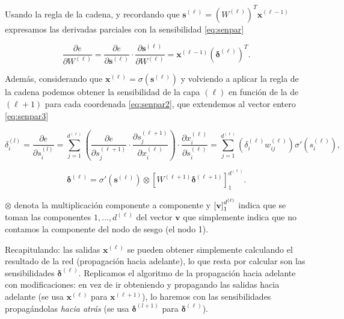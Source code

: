 Usando la regla de la cadena, y recordando que $\textbf{s}^{(\ell)} = (W^{(\ell)})^T \textbf{x}^{(\ell-1)}$ expresamos las derivadas parciales con la sensibilidad \eqref{eq:senpar} \cite{abu2012learning}

\begin{equation}
  \dfrac{\partial e}{\partial W^{(\ell)}} = \dfrac{\partial e}{\partial \textbf{s}^{(\ell)}} \cdot \dfrac{\partial \textbf{s}^{(\ell)}}{\partial W^{(\ell)}} = \textbf{x}^{(\ell - 1)}(\pmb{\delta}^{(\ell)})^T.
  \label{eq:senpar}
\end{equation}

Además, considerando que $\textbf{x}^{(\ell)} = \sigma(\textbf{s}^{(\ell)})$ y volviendo a aplicar la regla de la cadena podemos obtener la sensibilidad de la capa $(\ell)$ en función de la de $(\ell + 1)$ para cada coordenada \eqref{eq:senpar2}, que extendemos al vector entero \eqref{eq:senpar3} \cite{abu2012learning}

\begin{equation}
  \delta_i^{(l)} = \dfrac{\partial e}{\partial s_i^{(l)}} =  \sum \limits^{d^{(\ell)}}_{j = 1} \left(\dfrac{\partial e}{\partial s_j^{(\ell + 1)}} \cdot \dfrac{\partial s_j^{(\ell + 1)}}{\partial x_i^{(\ell)}} \right) \cdot \dfrac{\partial x_i^{(\ell)}}{\partial s_i^{(\ell)}} = \sum \limits^{d^{(\ell)}}_{j = 1} \left(\delta^{(\ell)}_i w_{ij}^{(\ell)}\right) \sigma'(s_i^{(\ell)}),
  \label{eq:senpar2}
\end{equation}

\begin{equation}
  \pmb{\delta}^{(\ell)} = \sigma'(\textbf{s}^{(\ell)}) \otimes \left[W^{(\ell + 1)} \pmb{\delta}^{(\ell + 1)}\right]^{d^{(\ell)}}_1.
  \label{eq:senpar3}
\end{equation}

$\otimes$ denota la multiplicación componente a componente y $\left[\empty\textbf{v}\right]^{d^{(\ell)}}_{1}$ indica que se toman las componentes $1, \ldots, d^{(\ell)}$ del vector $\textbf{v}$ que simplemente indica que no contamos la componente del nodo de sesgo (el nodo 1).

Recapitulando: las salidas $\textbf{x}^{(\ell)}$ se pueden obtener simplemente calculando el resultado de la red (propagación hacia adelante), lo que resta por calcular son las sensibilidades $\pmb{\delta}^{(\ell)}$. Replicamos el algoritmo de la propagación hacia adelante con modificaciones: en vez de ir obteniendo y propagando las salidas hacia adelante (se usa $\textbf{x}^{(\ell)}$ para $\textbf{x}^{(\ell + 1)}$), lo haremos con las sensibilidades propagándolas \emph{hacia atrás} (se usa $\pmb{\delta}^{(l+1)}$ para $\pmb{\delta}^{(\ell)}$).


